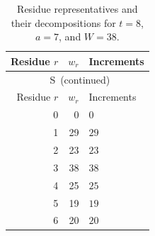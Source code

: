 \documentclass[10pt]{article}
\renewcommand{\thetable}{S\arabic{table}}
\numberwithin{equation}{section}
\begin{document}
\begingroup
\setlength{\LTpre}{6pt plus 2pt minus 1pt}
\setlength{\LTpost}{4pt plus 2pt minus 1pt}
\setlength{\abovecaptionskip}{4pt}
\begin{longtable}{@{}rrl@{}}
\caption{Residue representatives and their decompositions for $t=8$, $a=7$, and $W=38$.}\label{finite:tab:residues-8}\\
\toprule
Residue $r$&$w_r$&Increments\\\midrule
\endfirsthead
\multicolumn{3}{c}{\tablename~\thetable\ (continued)}\\
\toprule
Residue $r$&$w_r$&Increments\\\midrule
\endhead
0 & 0 & $0$\\
1 & 29 & $29$\\
2 & 23 & $23$\\
3 & 38 & $38$\\
4 & 25 & $25$\\
5 & 19 & $19$\\
6 & 20 & $20$\\
\bottomrule
\end{longtable}
\setlength{\tabcolsep}{2.2pt}
\end{document}
